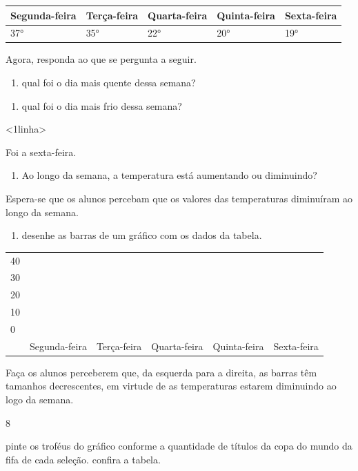 \begin{longtable}[]{@{}lllll@{}}
\toprule
Segunda-feira & Terça-feira & Quarta-feira & Quinta-feira & Sexta-feira\tabularnewline
\midrule
\endhead
37° & 35° & 22° & 20° & 19°\tabularnewline
\bottomrule
\end{longtable}

Agora, responda ao que se pergunta a seguir.

\begin{enumerate}
\def\labelenumi{\Alph{enumi})}
\item
  qual foi o dia mais quente dessa semana?
\end{enumerate}


\begin{enumerate}
\def\labelenumi{\Alph{enumi})}
\item
  qual foi o dia mais frio dessa semana?
\end{enumerate}

\textless{}1linha\textgreater{}

Foi a sexta-feira.

\begin{enumerate}
\def\labelenumi{\Alph{enumi})}
\item
  Ao longo da semana, a temperatura está aumentando ou diminuindo?
\end{enumerate}

Espera-se que os alunos percebam que os valores das temperaturas diminuíram ao longo da semana.

\begin{enumerate}
\def\labelenumi{\Alph{enumi})}
\item
  desenhe as barras de um gráfico com os dados da tabela.
\end{enumerate}

\begin{longtable}[]{@{}llllll@{}}
\toprule
40 & & & & &\tabularnewline
30 & & & & &\tabularnewline
20 & & & & &\tabularnewline
10 & & & & &\tabularnewline
0 & & & & &\tabularnewline
& Segunda-feira & Terça-feira & Quarta-feira & Quinta-feira & Sexta-feira\tabularnewline
\bottomrule
\end{longtable}

Faça os alunos perceberem que, da esquerda para a direita, as barras têm
tamanhos decrescentes, em virtude de as temperaturas estarem diminuindo
ao logo da semana.

\num{8}

pinte os troféus do gráfico conforme a quantidade de títulos da copa do
mundo da fifa de cada seleção. confira a tabela.

